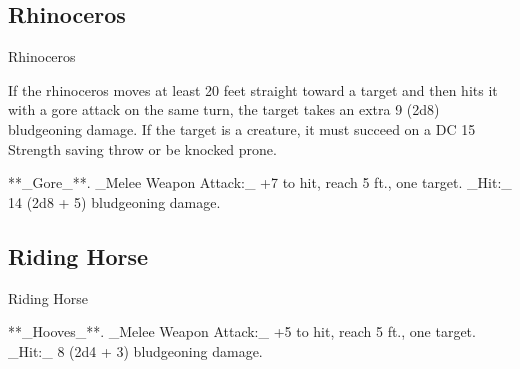 \subsection{Rhinoceros}
\begin{DndMonster}[float=*b,width\textwidth + 8pt]{Rhinoceros}
\begin{multicols}{2}
\DndMonsterBasics[armor-class={11 (natural armor)}, hit-points={45 (6d10 + 12)}, speed={40 ft.}]
\DndMonsterDetails[saving-throws={}, skills={}, damage-immunities={}, damage-resistances={}, damage-vulnerabilities={}, condition-immunities={}, senses={passive Perception 11}, languages={—}, challenge={2 (450 XP)}]
 If the rhinoceros moves at least 20 feet straight toward a target and then hits it with a gore attack on the same turn, the target takes an extra 9 (2d8) bludgeoning damage. If the target is a creature, it must succeed on a DC 15 Strength saving throw or be knocked prone.

**_Gore_**. _Melee Weapon Attack:_ +7 to hit, reach 5 ft., one target. _Hit:_ 14 (2d8 + 5) bludgeoning damage.
\end{multicols}
\end{DndMonster}
\subsection{Riding Horse}
\begin{DndMonster}[float=*b,width\textwidth + 8pt]{Riding Horse}
\begin{multicols}{2}
\DndMonsterBasics[armor-class={10}, hit-points={13 (2d10 + 2)}, speed={60 ft.}]
\DndMonsterDetails[saving-throws={}, skills={}, damage-immunities={}, damage-resistances={}, damage-vulnerabilities={}, condition-immunities={}, senses={passive Perception 10}, languages={—}, challenge={1/4 (50 XP)}]
**_Hooves_**. _Melee Weapon Attack:_ +5 to hit, reach 5 ft., one target. _Hit:_ 8 (2d4 + 3) bludgeoning damage.
\end{multicols}
\end{DndMonster}
